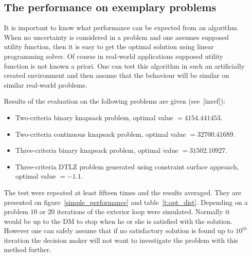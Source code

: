 \clearpage{}
\subsection{The performance on exemplary problems}
\label{nouncert-performance}
It is important to know what performance can be expected from an
algorithm. When no uncertainty is considered in a problem and one assumes
supposed utility function, then it is easy to get the optimal solution using
linear programming solver. Of course in real-world applications supposed
utility function is not known a priori. One can test this algorithm in such an
artificially created environment and then assume that the behaviour will be
similar on similar real-world problems.

Results of the evaluation on the following problems are given (see~[inref]):
\begin{itemize}
\item Two-criteria binary knapsack problem, optimal value $= 4154.441453$.
\item Two-criteria continuous knapsack problem, optimal value $= 32700.41689$.
\item Three-criteria binary knapsack problem, optimal value $= 31502.10927$.
\item Three-criteria DTLZ problem generated using constraint surface approach, optimal value $= -1.1$.
\end{itemize}

The test were repeated at least fifteen times and the results averaged. They
are presented on figure~\ref{simple_performance} and
table~\ref{t:opt_dist}. Depending on a problem $10$ or $20$ iterations of the
exterior loop were simulated. Normally it would be up to the DM to stop when
he or she is satisfied with the solution. However one can safely assume that
if no satisfactory solution is found up to $10^{th}$ iteration the decision
maker will not want to investigate the problem with this method further.

